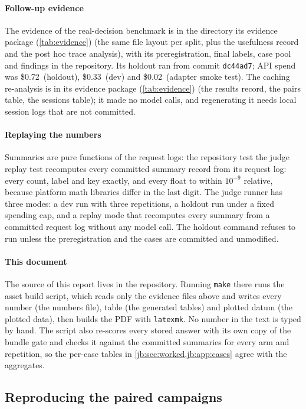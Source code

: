 \documentclass[11pt,letterpaper]{article}
\newcommand{\code}[1]{\texttt{#1}}
\newcommand{\TrCommit}{dc44ad7}
\newcommand{\TrSpendDev}{0.33}
\newcommand{\TrSpendHold}{0.72}
\newcommand{\TrSpendSmoke}{0.02}
\begin{document}
\paragraph{Follow-up evidence} The evidence of the real-decision benchmark is in the directory
its evidence package (\cref{tab:evidence}) (the same file layout per split, plus
the usefulness record and the post hoc trace analysis), with its preregistration, final
labels, case pool and findings in the repository. Its holdout ran from commit
\code{\TrCommit}; API spend was \$\TrSpendHold\ (holdout), \$\TrSpendDev\ (dev) and \$\TrSpendSmoke\
(adapter smoke test). The caching re-analysis is in its evidence package (\cref{tab:evidence})
(the results record, the pairs table, the sessions table); it made no model calls, and regenerating it
needs local session logs that are not committed.

\paragraph{Replaying the numbers} Summaries are pure functions of the request logs: the repository test
the judge replay test recomputes every committed summary record from its request log: every count, label and
key exactly, and every float to within $10^{-9}$ relative, because platform math libraries differ in the
last digit. The judge runner has three modes: a dev run with three repetitions, a holdout run under a fixed spending cap, and a replay mode that recomputes every summary from a committed request log without any model call.
The holdout command refuses to run unless the preregistration and the cases are committed and unmodified.

\paragraph{This document} The source of this report lives in
the repository. Running \code{make} there runs
the asset build script, which reads only the evidence files above and writes every number
(the numbers file), table (the generated tables) and plotted datum
(the plotted data), then builds the PDF with \code{latexmk}. No number in the text is typed by hand.
The script also re-scores every stored answer with its own copy of the bundle gate and checks it against
the committed summaries for every arm and repetition, so the per-case tables in
\cref{jb:sec:worked,jb:app:cases} agree with the aggregates.
\subsection{Reproducing the paired campaigns}\label{vt:sec:repro}
\end{document}
